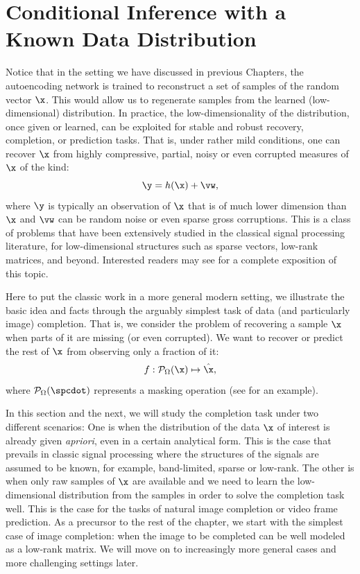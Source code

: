 \documentclass[../../book-main.tex]{subfiles}
\begin{document}
\section{Conditional Inference with a Known Data Distribution}
Notice that in the setting we have discussed in previous Chapters, the
autoencoding network is trained to reconstruct a set of samples of the random vector $\x$. This would allow us to regenerate samples from  the learned (low-dimensional) distribution. In practice, the low-dimensionality of the distribution, once given or learned, can be exploited for stable and robust recovery, completion, or prediction tasks. That is, under rather mild conditions, one can recover $\x$ from highly compressive, partial, noisy or even corrupted measures of $\x$ of the kind:
\begin{equation}
    \y = h(\x) + \vw,
\end{equation}
where $\y$ is typically an observation of $\x$ that is of much lower dimension than $\x$ and $\vw$ can be random noise or even sparse gross corruptions. This is a class of problems that have been extensively studied in the classical signal processing literature, for low-dimensional structures such as sparse vectors, low-rank matrices, and beyond. Interested readers may see \cite{Wright-Ma-2022} for a complete exposition of this topic.

Here to put the classic work in a more general modern setting, we illustrate the basic idea and facts through the arguably simplest task of data (and particularly image) completion. That is, we consider the problem of recovering a sample $\x$ when parts of it are missing (or even corrupted). We want to recover or predict the rest of $\x$
from observing only a fraction of it:
\begin{equation}
f: \mathcal{P}_{\Omega}(\x) \mapsto \hat{\x},
\end{equation}
where $\mathcal{P}_{\Omega}(\spcdot)$ represents a masking operation
(see  for an example).

In this section and the next, we will study the completion task under two different scenarios: One is when the distribution of the data $\x$ of interest is already given {\em apriori}, even in a certain analytical form. This is the case that prevails in classic signal processing where the structures of the signals are assumed to be known, for example,  band-limited, sparse or low-rank. The other is when only raw samples of $\x$ are available and we need to learn the low-dimensional distribution from the samples in order to solve the completion task well. This is the case for the tasks of natural image completion or video frame prediction. As a precursor to the rest of the chapter, we start with the simplest case of image completion: when the image to be completed can be well modeled as a low-rank matrix. We will move on to increasingly more general cases and more challenging settings later.
\end{document}
